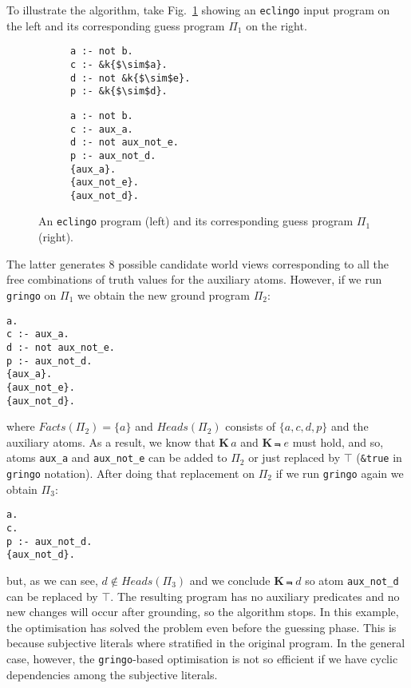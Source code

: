 \documentclass{new_tlp}
\def\K{\mathbf{K}\, }
\def\eclingo{{\tt eclingo}}
\def\bL{\K}
\def\Facts{\mathit{Facts}}
\def\Heads{\mathit{Heads}}
\begin{document}
To illustrate the algorithm, take Fig.~\ref{fig:p1} showing an \eclingo{} input program on the left and its corresponding guess program $\Pi_1$ on the right.
%
\begin{figure}[htbp]
\begin{subfigure}{.4\textwidth}
\begin{lstlisting}[frame = single, mathescape, basicstyle = \ttfamily, belowskip=37pt]
a :- not b.
c :- &k{$\sim$a}.
d :- not &k{$\sim$e}.
p :- &k{$\sim$d}.
\end{lstlisting}
\end{subfigure}
\hspace{25pt}
\begin{subfigure}{.4\textwidth}
\begin{lstlisting}[frame = single, mathescape, basicstyle = \ttfamily]
a :- not b.
c :- aux_a.
d :- not aux_not_e.
p :- aux_not_d.
{aux_a}.
{aux_not_e}.
{aux_not_d}.  
\end{lstlisting}
\end{subfigure}
\setlength{\abovecaptionskip}{5pt}
\caption{An \eclingo{} program (left) and its corresponding guess program $\Pi_1$ (right).}
\label{fig:p1}
\end{figure}
%
The latter generates 8 possible candidate world views corresponding to all the free combinations of truth values for the auxiliary atoms.
%
However, if we run {\tt gringo} on $\Pi_1$ we obtain the new ground program $\Pi_2$:
\begin{Verbatim}[frame=single]
a.
c :- aux_a.
d :- not aux_not_e.
p :- aux_not_d.
{aux_a}.
{aux_not_e}.
{aux_not_d}.  
\end{Verbatim}
where $\Facts(\Pi_2)=\{a\}$ and $\Heads(\Pi_2)$ consists of $\{a,c,d,p\}$ and the auxiliary atoms.
%
As a result, we know that $\bL a$ and $\bL \Not\; e$ must hold, and so, atoms {\tt aux\_a} and {\tt aux\_not\_e} can be added to $\Pi_2$ or just replaced by $\top$ ({\tt \&true} in {\tt gringo} notation).
%
After doing that replacement on $\Pi_2$ if we run {\tt gringo} again we obtain $\Pi_3$:
\begin{Verbatim}[frame=single]
a.
c.
p :- aux_not_d.
{aux_not_d}.
\end{Verbatim}
but, as we can see, $d \not\in \Heads(\Pi_3)$ and we conclude $\bL \Not \; d$ so atom {\tt aux\_not\_d} can be replaced by $\top$.
%
The resulting program has no auxiliary predicates and no new changes will occur after grounding, so the algorithm stops.
%
In this example, the optimisation has solved the problem even before the guessing phase.
%
This is because subjective literals where stratified in the original program.
%
In the general case, however, the {\tt gringo}-based optimisation is not so efficient if we have cyclic dependencies among the subjective literals.
\end{document}
